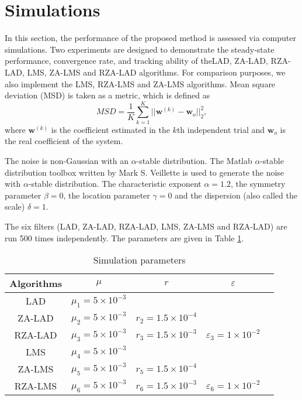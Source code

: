 \documentclass[conference]{IEEEtran}
\begin{document}
\section{Simulations}
\label{S4}
In this section, the performance of the proposed method is assessed via computer simulations. Two experiments are designed to demonstrate the steady-state performance, convergence rate, and tracking ability of theLAD, ZA-LAD, RZA-LAD, LMS, ZA-LMS and RZA-LAD algorithms. For comparison purposes, we also implement the LMS, RZA-LMS and ZA-LMS algorithms. Mean square deviation (MSD) is taken as a metric, which is defined as 
\begin{equation}
\label{eq_16}
MSD = \frac{1}{K} \sum_{k=1}^{K} || \mathbf{w}^{(k)} - \mathbf{w}_o||_2^2,
\end{equation}
where $\mathbf{w}^{(k)}$ is the coefficient estimated in the $k$th  independent trial and $\mathbf{w}_o$ is the real coefficient of the system.

The noise is non-Gaussian with an $\alpha$-stable distribution. The Matlab $\alpha$-stable distribution toolbox written by Mark S. Veillette is used to generate the noise with $\alpha$-stable distribution. The characteristic exponent $\alpha = 1.2$, the symmetry parameter $\beta = 0$, the location parameter $\gamma = 0$ and the dispersion (also called the scale) $\delta = 1$. 

The six filters (LAD, ZA-LAD, RZA-LAD, LMS, ZA-LMS and RZA-LAD) are run 500 times independently. The parameters are  given in Table \ref{table1}.
\begin{table}[!h]
\caption{Simulation parameters}
\label{table1}
\centering
\begin{tabular}{ccccc}
\hline
Algorithms & $\mu$ & $r$ & $\varepsilon$ \\
\hline
LAD & $\mu_1 = 5\times 10^{-3}$&  & \\
ZA-LAD & $\mu_2 = 5\times 10^{-3}$ &$r_2=1.5\times 10^{-4}$ & \\
RZA-LAD &$\mu_3 = 5\times 10^{-3}$& $r_3=1.5\times 10^{-3}$ &$\varepsilon_3=1\times 10^{-2}$\\
LMS & $\mu_4 = 5\times 10^{-3}$&  & \\
ZA-LMS & $\mu_5 = 5\times 10^{-3}$ &$r_5=1.5\times 10^{-4}$ & \\
RZA-LMS &$\mu_6 = 5\times 10^{-3}$& $r_6=1.5\times 10^{-3}$ &$\varepsilon_6=1\times 10^{-2}$\\
 \hline
\end{tabular}
\end{table}
\end{document}

